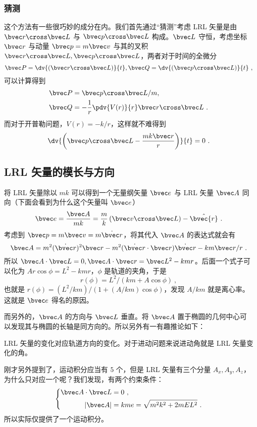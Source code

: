 \subsubsection{猜测}
这个方法有一些很巧妙的成分在内。我们首先通过“猜测”考虑 LRL 矢量是由 $\bvec r \cross \bvec L$ 与 $\bvec p \cross \bvec L$ 构成。$\bvec L$ 守恒，考虑坐标 $\bvec r$ 与动量 $\bvec p=m\bvec v$ 与其的叉积
$\bvec r \cross \bvec L, \bvec p \cross \bvec L$，两者对于时间的全微分
$$\bvec P= \dv{\left(\bvec r \cross \bvec L\right)}{t}, \bvec Q =\dv{\left(\bvec p \cross \bvec L\right)}{t} ~,$$
可以计算得到
$$\begin{aligned}
\bvec P &= \bvec p \cross \bvec L/m, \\
\bvec Q &= - \frac{1}{r} \pdv{V(r)}{r} \bvec r \cross \bvec L ~.
\end{aligned}$$
而对于开普勒问题，$V(r) = -k/r$，这样就不难得到
\begin{equation}
\dv{\left(\bvec p \cross \bvec L - \frac{m k \bvec r}{r}\right)}{t}=0 ~.
\end{equation}

\subsection{LRL 矢量的模长与方向}
将 LRL 矢量除以 $mk$ 可以得到一个无量纲矢量 $\bvec e$ 与 LRL 矢量 $\bvec A$ 同向（下面会看到为什么这个矢量叫 $\bvec e$）
$$\bvec e = \frac{\bvec A}{mk} = \frac{m}{k} \left(\bvec v \cross \bvec L \right)- \hat{\bvec{r}} ~.$$
考虑到 $\bvec p = m \bvec v = m \dot{\bvec r}$，将其代入 $\bvec A$ 的表达式就会有
$$\bvec A = m^2 (\dot{\bvec r})^2 \bvec r - m^2(\dot{\bvec r} \cdot \bvec r)\dot{\bvec r} - km \bvec r/r ~.$$
所以 $\bvec A \cdot \bvec L = 0, \bvec A \cdot \bvec r = \bvec L^2 - kmr$。后面一个式子可以化为 $Ar\cos \phi = L^2-kmr$，$\phi$ 是轨道的夹角，于是
$$r(\phi) = L^2/(km + A \cos \phi) ~,$$
也就是 $r(\phi) = (L^2/km)/(1+ (A/km) \cos \phi)$，发现 $A/km$ 就是离心率。这就是 $\bvec e$ 得名的原因。

而另外的，$\bvec A$ 的方向与 $\bvec L$ 垂直。将 $\bvec A$ 置于椭圆的几何中心可以发现其与椭圆的长轴是同方向的。所以另外有一有趣推论如下：
\begin{corollary}{}
LRL 矢量的变化对应轨道方向的变化。对于进动问题来说进动角就是 LRL 矢量变化的角。
\end{corollary}

刚才另外提到了，运动积分应当有 $5$ 个，但是 LRL 矢量有三个分量 $A_x, A_y, A_z$，为什么只对应一个呢？我们发现，有两个约束条件：
\begin{equation}
\left\{
\begin{aligned}
\bvec A \cdot \bvec L &= 0 ~, \\
|\bvec A| &= kme = \sqrt{m^2k^2 + 2m E L^2} ~. 
\end{aligned}
\right.
\end{equation}
所以实际仅提供了一个运动积分。

